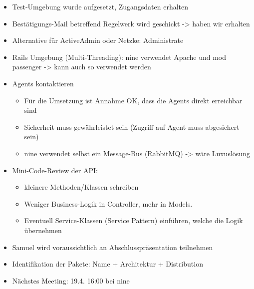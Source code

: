 \documentclass[class=scrbook,crop=false]{standalone}
\begin{document}
    \begin{itemize}
        \item Test-Umgebung wurde aufgesetzt, Zugangsdaten erhalten
        \item Bestätigungs-Mail betreffend Regelwerk wird geschickt -> haben wir erhalten
        \item Alternative für ActiveAdmin oder Netzke: Administrate
        \item Rails Umgebung (Multi-Threading): \gls{nine} verwendet Apache und mod \textunderscore passenger -> kann auch so verwendet werden
        \item Agents kontaktieren
        \begin{itemize}
            \item Für die Umsetzung ist Annahme OK, dass die Agents direkt erreichbar sind
            \item Sicherheit muss gewährleistet sein (Zugriff auf Agent muss abgesichert sein)
            \item \gls{nine} verwendet selbst ein Message-Bus (RabbitMQ) -> wäre Luxuslösung
        \end{itemize}
        \item Mini-Code-Review der API:
        \begin{itemize}
            \item kleinere Methoden/Klassen schreiben
            \item Weniger Business-Logik in Controller, mehr in Models.
            \item Eventuell Service-Klassen (Service Pattern) einführen, welche die Logik übernehmen
        \end{itemize}
        \item Samuel wird voraussichtlich an Abschlusspräsentation teilnehmen
        \item Identifikation der Pakete: Name + Architektur + Distribution
        \item Nächstes Meeting: 19.4. 16:00 bei \gls{nine}
    \end{itemize}
\end{document}
